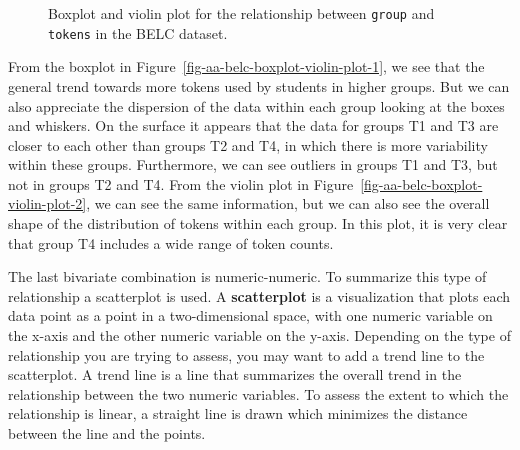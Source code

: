 \documentclass[
  letterpaper,
  DIV=11,
  numbers=noendperiod]{scrreport}
\theoremstyle{definition}
\theoremstyle{remark}
\begin{document}
\begin{figure}

\begin{minipage}[t]{0.50\linewidth}

{\centering 


}

\end{minipage}%
%
\begin{minipage}[t]{0.50\linewidth}

{\centering 


}

\end{minipage}%

\caption{\label{fig-aa-belc-boxplot-violin-plot}Boxplot and violin plot
for the relationship between \texttt{group} and \texttt{tokens} in the
BELC dataset.}

\end{figure}

From the boxplot in Figure~\ref{fig-aa-belc-boxplot-violin-plot-1}, we
see that the general trend towards more tokens used by students in
higher groups. But we can also appreciate the dispersion of the data
within each group looking at the boxes and whiskers. On the surface it
appears that the data for groups T1 and T3 are closer to each other than
groups T2 and T4, in which there is more variability within these
groups. Furthermore, we can see outliers in groups T1 and T3, but not in
groups T2 and T4. From the violin plot in
Figure~\ref{fig-aa-belc-boxplot-violin-plot-2}, we can see the same
information, but we can also see the overall shape of the distribution
of tokens within each group. In this plot, it is very clear that group
T4 includes a wide range of token counts.

The last bivariate combination is numeric-numeric. To summarize this
type of relationship a scatterplot is used. A \textbf{scatterplot} is a
visualization that plots each data point as a point in a two-dimensional
space, with one numeric variable on the x-axis and the other numeric
variable on the y-axis. Depending on the type of relationship you are
trying to assess, you may want to add a trend line to the scatterplot. A
trend line is a line that summarizes the overall trend in the
relationship between the two numeric variables. To assess the extent to
which the relationship is linear, a straight line is drawn which
minimizes the distance between the line and the points.
\end{document}
